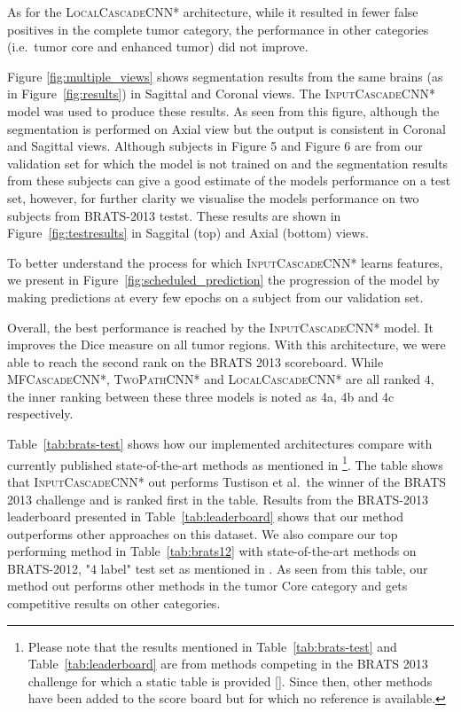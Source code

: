 \documentclass[final,5p,times,twocolumn]{elsarticle}
\begin{document}
{As for the \textsc{LocalCascadeCNN*} architecture, while it resulted in fewer false positives in the complete tumor category, the performance in other categories (i.e.\ tumor core and enhanced tumor) did not improve.

Figure \ref{fig:multiple_views} shows segmentation results from the same brains (as in Figure~\ref{fig:results}) in Sagittal and Coronal views. The \textsc{InputCascadeCNN*} model was used to produce these results. As seen from this figure, although the segmentation is performed on Axial view but the output is consistent in  Coronal and Sagittal views. Although subjects in Figure 5 and Figure 6 are from our validation set for which the model is not trained on and the segmentation results from these subjects can give a good estimate of the models performance on a test set, however, for further clarity we visualise the models performance on two subjects from BRATS-2013 testst. These results are shown in Figure~\ref{fig:testresults} in Saggital (top) and Axial (bottom) views.
 
To better understand the process for which \textsc{InputCascadeCNN*} learns features, we present in Figure~\ref{fig:scheduled_prediction} the progression of the model by making predictions at every few epochs on a subject from our validation set. 

Overall, the best performance is reached by the \textsc{InputCascadeCNN*} model. It improves the Dice measure on all tumor regions. With this architecture, we were able to reach the second rank on the BRATS 2013 scoreboard. While \textsc{MFCascadeCNN*}, \textsc{TwoPathCNN*} and \textsc{LocalCascadeCNN*} are all ranked $4$, the inner ranking between these three models is noted as 4a, 4b and 4c respectively.  



Table~\ref{tab:brats-test} shows how our implemented architectures compare with currently published state-of-the-art methods as mentioned in \citep{Menze2014}\footnote{Please note that the results mentioned in Table~\ref{tab:brats-test} and Table~\ref{tab:leaderboard} are from methods competing in the BRATS 2013 challenge for which a static table is provided []. Since then, other methods have been added to the score board but for which no reference is available.}.  The table shows that \textsc{InputCascadeCNN*} out performs Tustison et al.\, the winner of the BRATS 2013 challenge and is ranked first in the table.  Results from the BRATS-2013 leaderboard presented in Table~\ref{tab:leaderboard}  shows that our method outperforms other approaches on this dataset. We also compare our top performing method in Table~\ref{tab:brats12} with state-of-the-art methods on BRATS-2012, "4 label" test set as mentioned in \citep{Menze2014}. As seen from this table, our method out performs other methods in the tumor Core category and gets competitive results on other categories.

}
\end{document}
